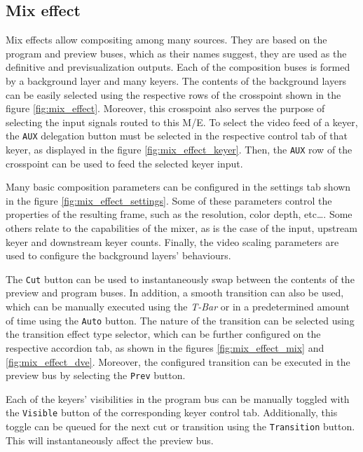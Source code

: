\documentclass[../main.tex]{subfiles}
\begin{document}
\subsection{Mix effect}
Mix effects allow compositing among many sources. They are based on the program and preview buses, which as their names suggest, they are used as the definitive and previsualization outputs. Each of the composition buses is formed by a background layer and many keyers. The contents of the background layers can be easily selected using the respective rows of the crosspoint shown in the figure \ref{fig:mix_effect}. Moreover, this crosspoint also serves the purpose of selecting the input signals routed to this M/E. To select the video feed of a keyer, the \texttt{AUX} delegation button must be selected in the respective control tab of that keyer, as displayed in the figure \ref{fig:mix_effect_keyer}. Then, the \texttt{AUX} row of the crosspoint can be used to feed the selected keyer input.\newline

Many basic composition parameters can be configured in the settings tab shown in the figure \ref{fig:mix_effect_settings}. Some of these parameters control the properties of the resulting frame, such as the resolution, color depth, etc\dots. Some others relate to the capabilities of the mixer, as is the case of the input, upstream keyer and downstream keyer counts. Finally, the video scaling parameters are used to configure the background layers' behaviours.\newline

The \texttt{Cut} button can be used to instantaneously swap between the contents of the preview and program buses. In addition, a smooth transition can also be used, which can be manually executed using the \textit{T-Bar} or in a predetermined amount of time using the \texttt{Auto} button. The nature of the transition can be selected using the transition effect type selector, which can be further configured on the respective accordion tab, as shown in the figures \ref{fig:mix_effect_mix} and \ref{fig:mix_effect_dve}. Moreover, the configured transition can be executed in the preview bus by selecting the \texttt{Prev} button.\newline 

Each of the keyers' visibilities in the program bus can be manually toggled with the \texttt{Visible} button of the corresponding keyer control tab. Additionally, this toggle can be queued for the next cut or transition using the \texttt{Transition} button. This will instantaneously affect the preview bus.\newline
\end{document}
